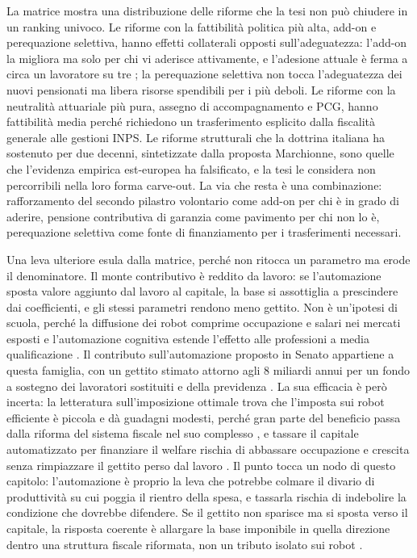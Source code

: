 \noindent
La matrice mostra una distribuzione delle riforme che la tesi non può
chiudere in un ranking univoco. Le riforme con la fattibilità politica più
alta, add-on e perequazione selettiva, hanno effetti collaterali opposti
sull'adeguatezza: l'add-on la migliora ma solo per chi vi aderisce
attivamente, e l'adesione attuale è ferma a circa un lavoratore su tre
\cite{FrancoTommasino2020}; la perequazione selettiva non tocca l'adeguatezza dei
nuovi pensionati ma libera risorse spendibili per i più deboli. Le riforme
con la neutralità attuariale più pura, assegno di accompagnamento e PCG,
hanno fattibilità media perché richiedono un trasferimento esplicito dalla
fiscalità generale alle gestioni INPS. Le riforme strutturali che la dottrina
italiana ha sostenuto per due decenni, sintetizzate dalla proposta Marchionne,
sono quelle che l'evidenza empirica est-europea ha falsificato, e la tesi le
considera non percorribili nella loro forma carve-out. La via che resta è una
combinazione: rafforzamento del secondo pilastro volontario come add-on per
chi è in grado di aderire, pensione contributiva di garanzia come pavimento
per chi non lo è, perequazione selettiva come fonte di finanziamento per i
trasferimenti necessari.

\medskip
\noindent
Una leva ulteriore esula dalla matrice, perché non ritocca un parametro ma erode il
denominatore. Il monte contributivo è reddito da lavoro: se l'automazione sposta
valore aggiunto dal lavoro al capitale, la base si assottiglia a prescindere dai
coefficienti, e gli stessi parametri rendono meno gettito. Non è un'ipotesi di
scuola, perché la diffusione dei robot comprime occupazione e salari nei mercati
esposti \cite{AcemogluRestrepo2020} e l'automazione cognitiva estende l'effetto alle
professioni a media qualificazione \cite{AcemogluJohnson2023}. Il contributo
sull'automazione proposto in Senato appartiene a questa famiglia, con un gettito
stimato attorno agli 8 miliardi annui per un fondo a sostegno dei lavoratori
sostituiti e della previdenza \cite{Bacchiocchi2025}. La sua efficacia è però
incerta: la letteratura sull'imposizione ottimale trova che l'imposta sui robot
efficiente è piccola e dà guadagni modesti, perché gran parte del beneficio passa
dalla riforma del sistema fiscale nel suo complesso \cite{Thuemmel2022}, e tassare il
capitale automatizzato per finanziare il welfare rischia di abbassare occupazione e
crescita senza rimpiazzare il gettito perso dal lavoro \cite{Furgase2025}. Il punto
tocca un nodo di questo capitolo: l'automazione è proprio la leva che potrebbe
colmare il divario di produttività su cui poggia il rientro della spesa, e tassarla
rischia di indebolire la condizione che dovrebbe difendere. Se il gettito non
sparisce ma si sposta verso il capitale, la risposta coerente è allargare la base
imponibile in quella direzione dentro una struttura fiscale riformata, non un
tributo isolato sui robot \cite{Hotte2024}.

